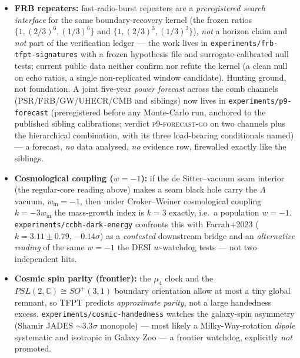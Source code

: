 \documentclass[11pt,a4paper]{article}
\begin{document}
\begin{gapbox}
\begin{itemize}
$0.53$--$3.06\%$ --- in every source at or below the strength of the detected upper pair line. A
well-powered null: the ladder reading gains no support (GR resonance stays favored) but is not killed,
since the harmonic branch did not fire either (the published integer lines $92{=}184/2$, $34/68$\,Hz
stand). \texttt{experiments/hfqpo-ladder} carries the preregistered census, selection-null Monte Carlo
and the executed archival scan. A search ansatz, no prediction; even a future tooth hit would be \mC\
until the mapping is derived.
\item \textbf{FRB repeaters:} fast-radio-burst repeaters are a \emph{preregistered search interface} for
the same boundary-recovery kernel (the frozen ratios $\{1,(2/3)^6,(1/3)^6\}$ and $\{1,(2/3)^3,(1/3)^3\}$),
\emph{not} a horizon claim and \emph{not} part of the verification ledger --- the work lives in
\texttt{experiments/frb-tfpt-signatures} with a frozen hypothesis file and surrogate-calibrated null tests;
current public data neither confirm nor refute the kernel (a clean null on echo ratios, a single
non-replicated window candidate). Hunting ground, not foundation.  A joint five-year \emph{power
forecast} across the comb channels (PSR/FRB/GW/UHECR/CMB and siblings) now lives in
\texttt{experiments/p9-forecast} (preregistered before any Monte-Carlo run, anchored to the published
sibling calibrations; verdict \textsc{p9-forecast-go} on two channels plus the hierarchical
combination, with its three load-bearing conditionals named) --- a forecast, \emph{no} data analysed,
\emph{no} evidence row, firewalled exactly like the siblings.
\item \textbf{Cosmological coupling ($w=-1$):} if the de Sitter--vacuum seam interior (the regular-core
reading above) makes a seam black hole carry the $\Lambda$ vacuum, $w_{\mathrm{in}}=-1$, then under
Croker--Weiner cosmological coupling $k=-3w_{\mathrm{in}}$ the mass-growth index is $k=3$ exactly, i.e.\ a
population $w=-1$. \texttt{experiments/ccbh-dark-energy} confronts this with Farrah+2023 ($k=3.11\pm0.79$,
$-0.14\sigma$) as a \emph{contested} downstream bridge and an \emph{alternative reading} of the same $w=-1$
the DESI $w$-watchdog tests --- not two independent hits.
\item \textbf{Cosmic spin parity (frontier):} the $\mu_4$ clock and the $PSL(2,\mathbb{C})\!\cong\!SO^+(3,1)$
boundary orientation allow at most a tiny global remnant, so TFPT predicts \emph{approximate parity}, not a
large handedness excess. \texttt{experiments/cosmic-handedness} watches the galaxy-spin asymmetry
(Shamir JADES $\sim3.3\sigma$ monopole) --- most likely a Milky-Way-rotation \emph{dipole} systematic and
isotropic in Galaxy Zoo --- a frontier watchdog, explicitly \emph{not} promoted.
\end{itemize}
\end{gapbox}
\end{document}
